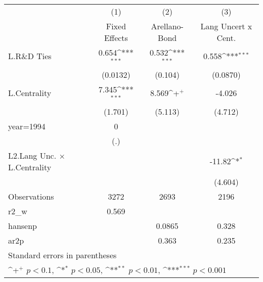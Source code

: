 {
\def\sym#1{\ifmmode^{#1}\else\(^{#1}\)\fi}
\begin{tabular}{l*{3}{c}}
\hline\hline
                    &\multicolumn{1}{c}{(1)}&\multicolumn{1}{c}{(2)}&\multicolumn{1}{c}{(3)}\\
                    &\multicolumn{1}{c}{Fixed Effects}&\multicolumn{1}{c}{Arellano-Bond}&\multicolumn{1}{c}{Lang Uncert x Cent.}\\
\hline
L.R\&D Ties         &       0.654\sym{***}&       0.532\sym{***}&       0.558\sym{***}\\
                    &    (0.0132)         &     (0.104)         &    (0.0870)         \\
L.Centrality        &       7.345\sym{***}&       8.569\sym{+}  &      -4.026         \\
                    &     (1.701)         &     (5.113)         &     (4.712)         \\
year=1994           &           0         &                     &                     \\
                    &         (.)         &                     &                     \\
L2.Lang Unc. $\times$ L.Centrality&                     &                     &      -11.82\sym{*}  \\
                    &                     &                     &     (4.604)         \\
\hline
Observations        &        3272         &        2693         &        2196         \\
r2\_w                &       0.569         &                     &                     \\
hansenp             &                     &      0.0865         &       0.328         \\
ar2p                &                     &       0.363         &       0.235         \\
\hline\hline
\multicolumn{4}{l}{\footnotesize Standard errors in parentheses}\\
\multicolumn{4}{l}{\footnotesize \sym{+} \(p<0.1\), \sym{*} \(p<0.05\), \sym{**} \(p<0.01\), \sym{***} \(p<0.001\)}\\
\end{tabular}
}
